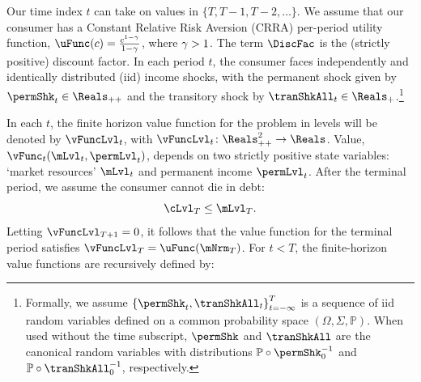 \documentclass[\econtexRoot/BufferStockTheory]{subfiles}
\begin{document}
Our time index $t$ can take on values in $\{T,T-1,T-2,\dots \}$. We assume that our consumer has a Constant Relative Risk Aversion (CRRA) per-period utility function, $\uFunc(c)=\frac{c^{1-\CRRA}}{1-\CRRA}$, where $\gamma>1$. The term $\DiscFac$ is the (strictly positive) discount factor. In each period $t$, the consumer faces independently and identically distributed (iid) income shocks, with the permanent shock given by $\permShk_{t} \in \Reals_{++}$ and the transitory shock by $\tranShkAll_{t} \in \Reals_{+}$.\footnote{Formally, we assume $\left\{\permShk_{t},\tranShkAll_{t}\right\}_{t=-\infty}^{T}$ is a sequence of iid random variables defined on a common probability space $(\Omega, \Sigma, \mathbb{P})$. When used without the time subscript, $\permShk$ and $\tranShkAll$ are the canonical random variables with distributions $\mathbb{P}\circ \permShk_{0}^{-1}$ and $\mathbb{P}\circ \tranShkAll_{0}^{-1}$, respectively.}

In each $t$, the finite horizon value function for the problem in levels will be denoted by $\vFuncLvl_{t}$, with $\vFuncLvl_{t}\colon \Reals_{++}^{2}\rightarrow \Reals$. Value, $\vFunc_{t}(\mLvl_{t}, \permLvl_{t})$, depends on two strictly positive state variables: `market resources' $\mLvl_{t}$ and permanent income $\permLvl_{t}$.
After the terminal period, we assume the consumer cannot die in debt:
%
\begin{equation}\label{eq:NoDebtAtDeath}
\cLvl_{T} \leq  \mLvl_{T} .
\end{equation}
%
Letting $\vFuncLvl_{T+1} = 0$, it follows that the value function for the terminal period satisfies $\vFuncLvl_{T} = \uFunc(\mNrm_{T})$.
For $t<T$, the finite-horizon value functions are recursively defined by:
\end{document}
